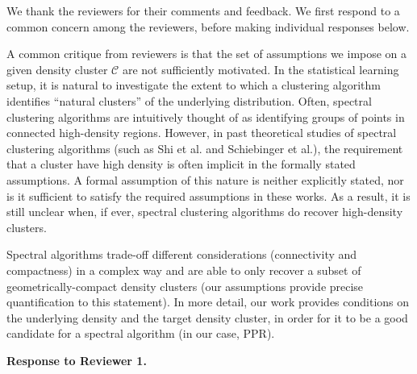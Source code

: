 \documentclass{article}
\begin{document}
We thank the reviewers for their comments and feedback. We first respond to a common concern among the reviewers, before making individual responses below.


A common critique from reviewers is that the set of assumptions we impose on a given density cluster $\mathcal{C}$ are not sufficiently motivated. 
In the statistical learning setup, it is natural to investigate the extent to which a clustering algorithm identifies ``natural clusters'' of the underlying distribution.
Often, spectral clustering algorithms are intuitively thought of as identifying groups of points in connected high-density regions. However, in past theoretical studies of spectral clustering algorithms (such as Shi et al. and Schiebinger et al.), the requirement that a cluster have high density is often implicit in the formally stated assumptions.  A formal assumption of this nature is neither explicitly stated, nor is it sufficient to satisfy the required assumptions in these works. As a result, it is still unclear when, if ever, spectral clustering algorithms do recover high-density clusters. 

Spectral algorithms trade-off different considerations (connectivity and compactness) in a complex way and are able to only recover a subset of geometrically-compact density clusters (our assumptions provide precise quantification to this statement).
In more detail, our work provides conditions on the underlying density and the target density cluster, in order for it to be a good candidate for a spectral algorithm (in our case, \textrm{PPR}). 



\textbf{Response to Reviewer 1.}
\end{document}
